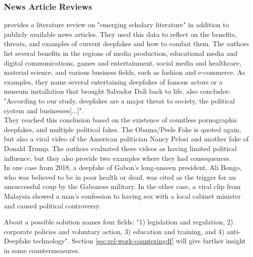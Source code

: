 \documentclass[
  a4paper,  %
  twoside,  %
  bibliography=totoc,
  headsepline,
  cleardoublepage=empty,
  parskip=half,
  draft=false
]{scrbook}
\begin{document}
\subsubsection*{News Article Reviews}
\citet{westerlundEmergenceDeepfakeTechnology2019a} provides a literature review on "emerging scholary literature" in addition to publicly available news articles. They used this data to reflect on the benefits, threats, and examples of current deepfakes and how to combat them. The authors list several benefits in the regions of media production, educational media and digital communications, games and entertainment, social media and healthcare, material science, and various business fields, such as fashion and e-commerce. As examples, they name several entertaining deepfakes of famous actors or a museum installation that brought Salvador Dalì back to life.  also concludes: "According to our study, deepfakes are a major threat to society, the political system and businesses[...]". \\
They reached this conclusion based on the existence of countless pornographic deepfakes, and multiple political fakes. The Obama/Peele Fake is quoted again, but also a viral video of the American politician Nancy Pelosi and another fake of Donald Trump. The authors evaluated these videos as having limited political influence, but they also provide two examples where they had consequences. \\
In one case from 2018, a deepfake of Gabon's long-unseen president, Ali Bongo, who was believed to be in poor health or dead, was cited as the trigger for an unsuccessful coup by the Gabonese military. In the other case, a viral clip from Malaysia showed a man's confession to having sex with a local cabinet minister and caused political controversy.

About a possible solution  names four fields: "1) legislation and regulation, 2) corporate policies and voluntary action, 3) education and training, and 4) anti-Deepfake technology". Section \ref{sec:rel-work-counteringdf} will give further insight in some countermeasures.
\end{document}
